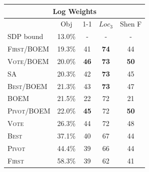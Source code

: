 \documentclass[11pt]{article}
\newcommand{\alg}[1]{\textsc{#1}}
\begin{document}
\begin{table}[th!]
\begin{tabular}{l|cccc}
\multicolumn{5}{c}{Log Weights}\\
\hline
 & Obj & 1-1 & $Loc_3$ & Shen F
\\ \hline
SDP bound & 13.0\% & - & - & -
\\ \hline
\alg{First}/\alg{BOEM} & 19.3\% & 41 & {\bf 74} & 44
\\ 
\alg{Vote}/\alg{BOEM} & 20.0\% & {\bf 46} & {\bf 73} & {\bf 50}
\\ 
SA & 20.3\% & 42 & {\bf 73} & 45
\\ 
\alg{Best}/\alg{BOEM} & 21.3\% & 43 & {\bf 73} & 47
\\ 
\alg{BOEM} & 21.5\% & 22 & 72 & 21
\\ 
\alg{Pivot}/\alg{BOEM} & 22.0\% & {\bf 45} & 72 & {\bf 50}
\\ 
\alg{Vote} & 26.3\% & 44 & 72 & 48
\\ 
\alg{Best} & 37.1\% & 40 & 67 & 44
\\ 
\alg{Pivot} & 44.4\% & 39 & 66 & 44
\\ 
\alg{First} & 58.3\% & 39 & 62 & 41
\\ 





\end{tabular}
\end{table}
\end{document}

